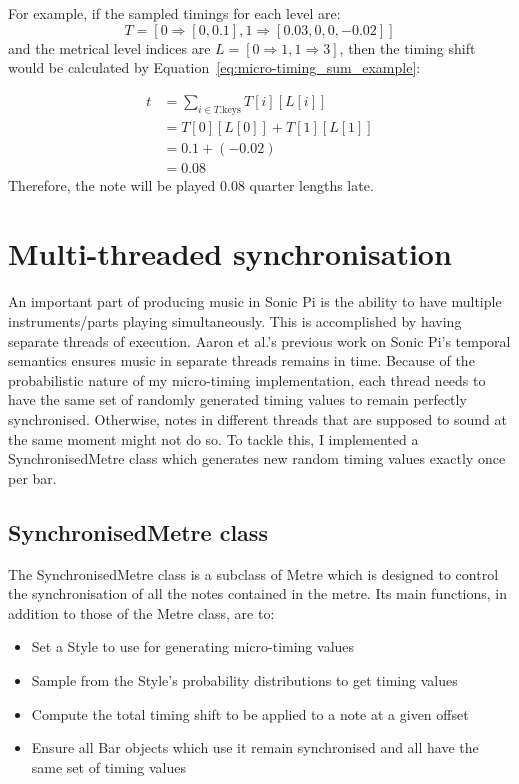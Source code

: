 \documentclass[12pt,twoside,openright]{report}
\begin{document}
For example, if the sampled timings for each level are:
\[ T=[0\Rightarrow[0,0.1],1\Rightarrow[0.03,0,0,-0.02]] \]
and the metrical level indices are $L=[0\Rightarrow1,1\Rightarrow3]$, then the timing shift would be
calculated by Equation~\ref{eq:micro-timing_sum_example}:

\begin{equation}
    \begin{split}
        t &= \sum_{i \in T.\mathrm{keys}} T[i][L[i]] \\
        &=T[0][L[0]]+T[1][L[1]] \\
        &=0.1+(-0.02) \\
        &=0.08
    \end{split}
    \label{eq:micro-timing_sum_example}
\end{equation}
Therefore, the note will be played 0.08 quarter lengths late.



\section{Multi-threaded synchronisation} \label{multi-threaded_synchronisation}

An important part of producing music in Sonic Pi is the ability to have multiple
instruments/parts playing simultaneously. This is accomplished by having
separate threads of execution. Aaron et al.'s previous work on Sonic Pi's
temporal semantics \cite{aaron2014} ensures music in separate threads remains in time.
Because of the probabilistic nature of my micro-timing implementation, each
thread needs to have the same set of randomly generated timing values to remain
perfectly synchronised. Otherwise, notes in different threads that are supposed
to sound at the same moment might not do so. To tackle this, I implemented a
SynchronisedMetre class which generates new random timing values exactly once
per bar.


\subsection{SynchronisedMetre class} \label{synchronised_metre}

The SynchronisedMetre class is a subclass of Metre which is designed to control
the synchronisation of all the notes contained in the metre. Its main functions,
in addition to those of the Metre class, are to:
\begin{itemize}
	\item Set a Style to use for generating micro-timing values
	\item Sample from the Style's probability distributions to get timing values
	\item Compute the total timing shift to be applied to a note at a given offset
	\item Ensure all Bar objects which use it remain synchronised and all have the same set of timing values
\end{itemize}
\end{document}
